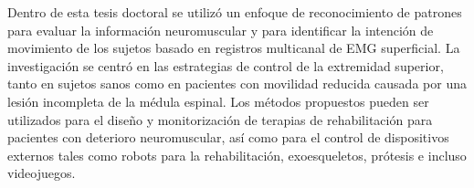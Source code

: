 \begin{resumen}
Dentro de esta tesis doctoral se utilizó un enfoque de reconocimiento de patrones para evaluar la información neuromuscular y para identificar la intención de movimiento de los sujetos basado en registros multicanal de EMG superficial. La investigación se centró en las estrategias de control de la extremidad superior, tanto en sujetos sanos como en pacientes con movilidad reducida causada por una lesión incompleta de la médula espinal. Los métodos propuestos pueden ser utilizados para el diseño y monitorización de terapias de rehabilitación para pacientes con deterioro neuromuscular, así como para el control de dispositivos externos tales como robots para la rehabilitación, exoesqueletos, prótesis e incluso videojuegos. 





\end{resumen}
